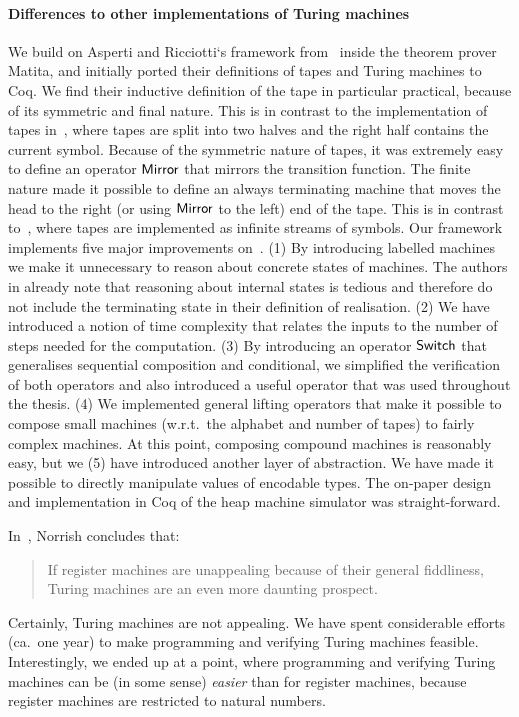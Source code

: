 \paragraph{Differences to other implementations of Turing machines}
We build on Asperti and Ricciotti`s framework from~\cite{asperti2015} inside the theorem prover Matita, and initially ported their definitions of
tapes and Turing machines to Coq.  We find their inductive definition of the tape in particular practical, because of its symmetric and final nature.
This is in contrast to the implementation of tapes in~\cite{xu2013}, where tapes are split into two halves and the right half contains the current
symbol.  Because of the symmetric nature of tapes, it was extremely easy to define an operator $\mathsf{Mirror}$ that mirrors the transition function.
The finite nature made it possible to define an always terminating machine that moves the head to the right (or using $\mathsf{Mirror}$ to the left) end
of the tape.  This is in contrast to~\cite{ciaffaglione2016}, where tapes are implemented as infinite streams of symbols.  Our framework implements
five major improvements on~\cite{asperti2015}.  (1) By introducing labelled machines we make it unnecessary to reason about concrete states of
machines.  The authors in \cite{asperti2015} already note that reasoning about internal states is tedious and therefore do not include the terminating
state in their definition of realisation.  (2) We have introduced a notion of time complexity that relates the inputs to the number of steps needed
for the computation.  (3) By introducing an operator $\mathsf{Switch}$ that generalises sequential composition and conditional, we simplified the verification
of both operators and also introduced a useful operator that was used throughout the thesis.  (4) We implemented general lifting operators that make
it possible to compose small machines (w.r.t.\ the alphabet and number of tapes) to fairly complex machines.  At this point, composing compound
machines is reasonably easy, but we (5) have introduced another layer of abstraction.  We have made it possible to directly manipulate values of
encodable types.  The on-paper design and implementation in Coq of the heap machine simulator was straight-forward.


In~\cite{norrish2011mechanised}, Norrish concludes that:
\begin{quote}
  If register machines are unappealing because of their general fiddliness, Turing machines are an even more daunting prospect.
\end{quote}
Certainly, Turing machines are not appealing.  We have spent considerable efforts (ca.\ one year) to make programming and verifying Turing machines
feasible.  Interestingly, we ended up at a point, where programming and verifying Turing machines can be (in some sense) \textit{easier} than for
register machines, because register machines are restricted to natural numbers.


